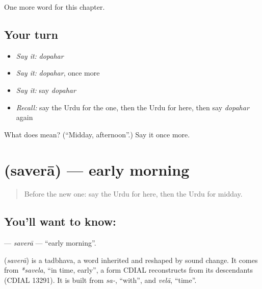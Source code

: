 \begin{grammarlens}[title={What you've built}]
One more word for this chapter.
\end{grammarlens}

\subsection*{Your turn}
\begin{itemize}
\raggedright
  \item \emph{Say it:} \emph{dopahar}
  \item \emph{Say it:} \emph{dopahar}, once more
  \item \emph{Say it:} say \emph{dopahar}
  \item \emph{Recall:} say the Urdu for the one, then the Urdu for here, then say \emph{dopahar} again
\end{itemize}

\begin{tcolorbox}[breakable,colback=teal!4,colframe=teal!35!black,title={Before you move on}]
What does  mean? (\textquotedblleft{}Midday, afternoon\textquotedblright{}.) Say it once more.
\end{tcolorbox}
\section[\texorpdfstring{\ur{سویرا} (saverā)}{سویرا (saverā)}]{ (saverā) — early morning}

\label{lesson:UR-C91-savera}



\begin{quote}
Before the new one: say the Urdu for here, then the Urdu for midday.
\end{quote}

\subsection*{You'll want to know: }
\textbf{} — \emph{saverā} — \textquotedblleft{}early morning\textquotedblright{}.

\begin{cousinweb}
\textbf{} (\emph{saverā}) is a tadbhava, a word inherited and reshaped by sound change. It comes from \emph{*savela}, \textquotedblleft{}in time, early\textquotedblright{}, a form CDIAL reconstructs from its descendants (CDIAL 13291). It is built from \emph{sa-}, \textquotedblleft{}with\textquotedblright{}, and \emph{velā}, \textquotedblleft{}time\textquotedblright{}.
\end{cousinweb}

